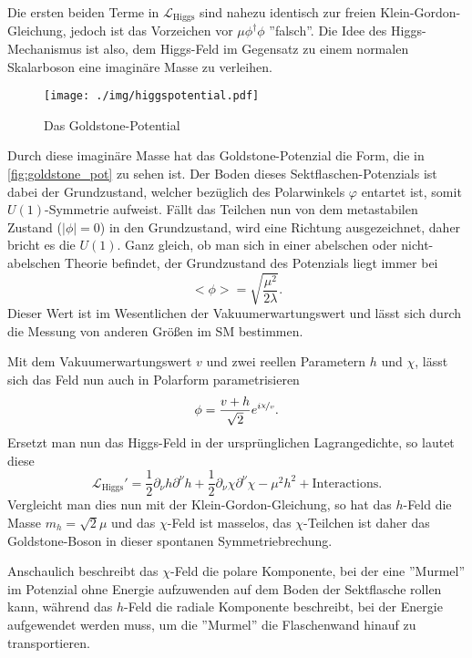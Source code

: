 Die ersten beiden Terme in $\mathcal{L}_\text{Higgs}$ sind nahezu identisch zur freien Klein-Gordon-Gleichung, jedoch ist das Vorzeichen vor $\mu\phi^\dagger\phi$ ''falsch''.
Die Idee des Higgs-Mechanismus ist also, dem Higgs-Feld im Gegensatz zu einem normalen Skalarboson eine imaginäre Masse zu verleihen.

\begin{figure}
	\centering
	\texttt{[image: ./img/higgspotential.pdf]}
	\caption{Das Goldstone-Potential}
	\label{fig:goldstone_pot}
\end{figure}
Durch diese imaginäre Masse hat das Goldstone-Potenzial die Form, die in \autoref{fig:goldstone_pot} zu sehen ist.
Der Boden dieses Sektflaschen-Potenzials ist dabei der Grundzustand, welcher bezüglich des Polarwinkels $\varphi$ entartet ist, somit $U(1)$-Symmetrie aufweist.
Fällt das Teilchen nun von dem metastabilen Zustand ($|\phi|=0$) in den Grundzustand, wird eine Richtung ausgezeichnet, daher bricht es die $U(1)$.
Ganz gleich, ob man sich in einer abelschen oder nicht-abelschen Theorie befindet, der Grundzustand des Potenzials liegt immer bei
\begin{equation*}
	<\phi> = \sqrt{\frac{\mu^2}{2\lambda}}.
\end{equation*}
Dieser Wert ist im Wesentlichen der Vakuumerwartungswert und lässt sich durch die Messung von anderen Größen im SM bestimmen.

Mit dem Vakuumerwartungswert $v$ und zwei reellen Parametern $h$ und $\chi$, lässt sich das Feld nun auch in Polarform parametrisieren
\begin{equation*}
	\phi = \frac{v+h}{\sqrt{2}}e^{i\nicefrac{\chi}{v}}.
\end{equation*}
Ersetzt man nun das Higgs-Feld in der ursprünglichen Lagrangedichte, so lautet diese
\begin{equation*}
	\mathcal{L}_\text{Higgs}' = \frac{1}{2}\partial_\nu h\partial^\nu h + \frac{1}{2}\partial_\nu\chi\partial^\nu\chi - \mu^2h^2 + \text{Interactions}.
\end{equation*}
Vergleicht man dies nun mit der Klein-Gordon-Gleichung, so hat das $h$-Feld die Masse $m_h=\sqrt{2}\mu$ und das $\chi$-Feld ist masselos, das $\chi$-Teilchen ist daher das Goldstone-Boson in dieser spontanen Symmetriebrechung.

Anschaulich beschreibt das $\chi$-Feld die polare Komponente, bei der eine ''Murmel'' im Potenzial ohne Energie aufzuwenden auf dem Boden der Sektflasche rollen kann, während das $h$-Feld die radiale Komponente beschreibt, bei der Energie aufgewendet werden muss, um die ''Murmel'' die Flaschenwand hinauf zu transportieren.
